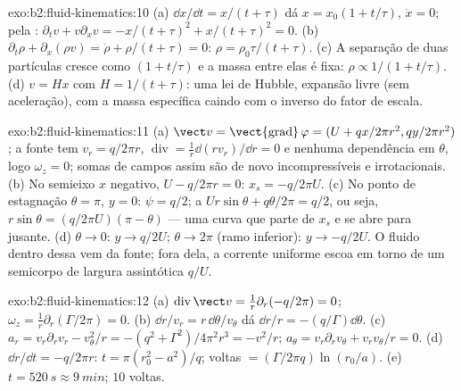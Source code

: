 \begin{solution}{exo:b2:fluid-kinematics:10}
(a) $\dd x/\dd t = x/(t + \tau)$ dá $x = x_0(1 + t/\tau)$, $\ddot x = 0$;
pela : $\partial_tv + v\partial_xv = -x/(t + \tau)^2 + x/(t + \tau)^2
= 0$. (b) $\partial_t\rho + \partial_x(\rho v) = \dot\rho + \rho/(t + \tau) = 0$: $\rho =
\rho_0\tau/(t + \tau)$. (c) A separação de duas partículas cresce como $(1 + t/\tau)$
e a massa entre elas é fixa: $\rho \propto 1/(1 + t/\tau)$. (d) $v =
Hx$ com $H = 1/(t + \tau)$: uma lei de Hubble, expansão livre (sem
aceleração), com a massa específica caindo com o inverso do fator de escala.
\end{solution}

\begin{solution}{exo:b2:fluid-kinematics:11}
(a) $\vect v = \operatorname{\vect{grad}}\varphi = (U + qx/2\pi r^2, qy/2\pi r^2)$;
a fonte tem $v_r = q/2\pi r$, $\operatorname{div} = \frac1r\dd(rv_r)/\dd r
= 0$ e nenhuma dependência em $\theta$, logo $\omega_z = 0$; somas de campos assim são
de novo incompressíveis e irrotacionais. (b) No semieixo $x$ negativo,
$U - q/2\pi r = 0$: $x_s = -q/2\pi U$. (c) No ponto de estagnação $\theta =
\pi$, $y = 0$: $\psi = q/2$; a  $Ur\sin\theta + q\theta/2\pi = q/2$,
ou seja, $r\sin\theta = (q/2\pi U)(\pi - \theta)$ --- uma curva que parte de $x_s$ e
se abre para jusante. (d) $\theta \to 0$: $y \to q/2U$; $\theta \to 2\pi$ (ramo
inferior): $y \to -q/2U$. O fluido dentro dessa  vem da
fonte; fora dela, a corrente uniforme escoa em torno de um semicorpo de
largura assintótica $q/U$.
\end{solution}

\begin{solution}{exo:b2:fluid-kinematics:12}
(a) $\operatorname{div}\vect v = \frac1r\partial_r(-q/2\pi) = 0$; $\omega_z =
\frac1r\partial_r(\Gamma/2\pi) = 0$. (b) $\dd r/v_r = r\,\dd\theta/v_\theta$ dá
$\dd r/r = -(q/\Gamma)\dd\theta$. (c) $a_r = v_r\partial_rv_r - v_\theta^2/r =
-(q^2 + \Gamma^2)/4\pi^2r^3 = -v^2/r$; $a_\theta = v_r\partial_rv_\theta + v_rv_\theta/r
= 0$. (d) $\dd r/\dd t = -q/2\pi r$: $t = \pi(r_0^2 - a^2)/q$; voltas
$= (\Gamma/2\pi q)\ln(r_0/a)$. (e) $t = \qty{520}{s} \approx \qty{9}{min}$; $10$
voltas.
\end{solution}

